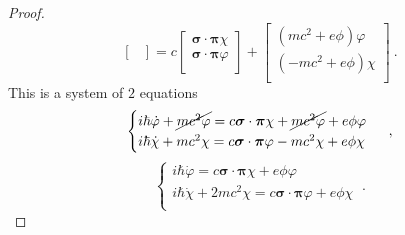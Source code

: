 \begin{proof}
\begin{equation*}
\begin{bmatrix}
            \end{bmatrix} = c \begin{bmatrix}
                \boldsymbol \sigma \cdot \boldsymbol \pi \chi\\
                \boldsymbol \sigma \cdot \boldsymbol \pi \varphi \\
            \end{bmatrix} + \begin{bmatrix}
                (m c^2 + e \phi) \varphi\\ (-m c^2 + e \phi) \chi \\
            \end{bmatrix} ~.
        \end{equation*}
        This is a system of $2$ equations 
        \begin{equation*}
            \begin{cases}
                i \hbar \dot \varphi + \cancel{m c^2 \varphi} = c \boldsymbol \sigma \cdot \boldsymbol \pi \chi + \cancel{m c^2 \varphi} + e \phi \varphi \\
                i \hbar \dot \chi + m c^2 \chi = c \boldsymbol \sigma \cdot \boldsymbol \pi \varphi - m c^2 \chi + e \phi \chi \\
            \end{cases} ~,
        \end{equation*}
        \begin{equation*}
            \begin{cases}
                i \hbar \dot \varphi = c \boldsymbol \sigma \cdot \boldsymbol \pi \chi + e \phi \varphi\\
                i \hbar \dot \chi + 2m c^2 \chi = c \boldsymbol \sigma \cdot \boldsymbol \pi \varphi + e \phi \chi\\
            \end{cases} ~.
        \end{equation*}


\end{proof}
